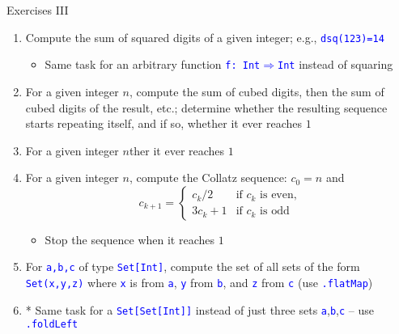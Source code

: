\documentclass[english]{beamer}
\begin{document}
\begin{frame}{Exercises III}

\begin{enumerate}
\item Compute the sum of squared digits of a given integer; e.g., \texttt{\textcolor{blue}{\footnotesize{}dsq(123)=14}}{\footnotesize\par}
\begin{itemize}
\item Same task for an arbitrary function \texttt{\textcolor{blue}{\footnotesize{}f:\ Int$\Rightarrow$Int}}
instead of squaring
\end{itemize}
\item For a given integer $n$, compute the sum of cubed digits, then the
sum of cubed digits of the result, etc.; determine whether the resulting
sequence starts repeating itself, and if so, whether it ever reaches
$1$
\item For a given integer $n$ther it ever reaches
$1$
\item For a given integer $n$, compute the Collatz sequence: $c_{0}=n$
and
\[
c_{k+1}=\begin{cases}
c_{k}/2 & \text{if }c_{k}\text{ is even,}\\
3c_{k}+1 & \text{if }c_{k}\text{ is odd}
\end{cases}
\]

\begin{itemize}
\item Stop the sequence when it reaches $1$
\end{itemize}
\item For \texttt{\textcolor{blue}{\footnotesize{}a,b,c}} of type \texttt{\textcolor{blue}{\footnotesize{}Set{[}Int{]}}},
compute the set of all sets of the form \texttt{\textcolor{blue}{\footnotesize{}Set(x,y,z)}}
where \texttt{\textcolor{blue}{\footnotesize{}x}} is from \texttt{\textcolor{blue}{\footnotesize{}a}},
\texttt{\textcolor{blue}{\footnotesize{}y}} from \texttt{\textcolor{blue}{\footnotesize{}b}},
and \texttt{\textcolor{blue}{\footnotesize{}z}} from \texttt{\textcolor{blue}{\footnotesize{}c}}
(use \texttt{\textcolor{blue}{\footnotesize{}.flatMap}})
\item {*} Same task for a \texttt{\textcolor{blue}{\footnotesize{}Set{[}Set{[}Int{]}{]}}}
instead of just three sets \texttt{\textcolor{blue}{\footnotesize{}a}},\texttt{\textcolor{blue}{\footnotesize{}b}},\texttt{\textcolor{blue}{\footnotesize{}c}}
-- use \texttt{\textcolor{blue}{\footnotesize{}.foldLeft}}{\footnotesize\par}
\end{enumerate}
\end{frame}
\end{document}
